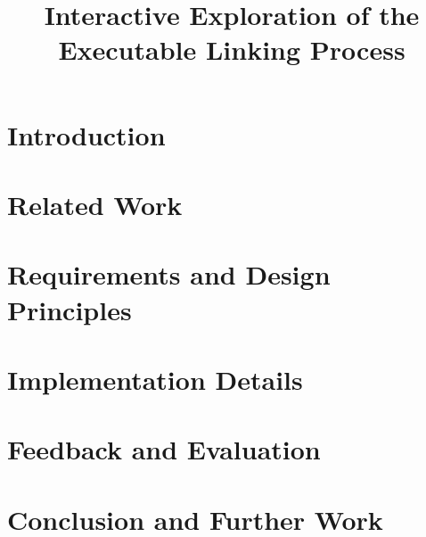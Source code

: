\documentclass[conference]{IEEEtran}
\begin{document}
\title{Interactive Exploration of the Executable Linking Process}

\author{
\and
{}
}

\maketitle

\begin{abstract}

\end{abstract}

\section{Introduction}
\label{sec:introduction}


\section{Related Work}
\label{sec:related-work}


\section{Requirements and Design Principles}
\label{sec:design}


\section{Implementation Details}
\label{sec:implementation}


\section{Feedback and Evaluation}
\label{sec:evaluation}


\section{Conclusion and Further Work}
\label{sec:conclusion}




\end{document}
